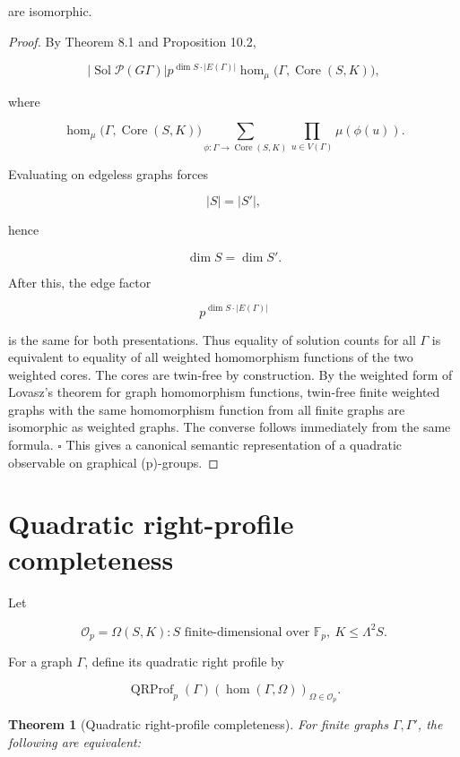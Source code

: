 \documentclass[11pt]{article}
\newtheorem{theorem}{Theorem}[section]
\begin{document}
are isomorphic.

\begin{proof}
By Theorem 8.1 and Proposition 10.2,

\[
|\operatorname{Sol}
{\mathcal P}(G
\Gamma)|
p^{\dim S\cdot |E(\Gamma)|}
\operatorname{hom}_{\mu}
\bigl(\Gamma,\operatorname{Core}(S,K)\bigr),
\]

where

\[
\operatorname{hom}_{\mu}
\bigl(\Gamma,\operatorname{Core}(S,K)\bigr)
\sum_{\phi:\Gamma\to\operatorname{Core}(S,K)}
\prod_{u\in V(\Gamma)}\mu(\phi(u)).
\]

Evaluating on edgeless graphs forces

\[
|S|=|S'|,
\]

hence

\[
\dim S=\dim S'.
\]

After this, the edge factor

\[
p^{\dim S\cdot |E(\Gamma)|}
\]

is the same for both presentations. Thus equality of solution counts for all $\Gamma$ is equivalent to equality of all weighted homomorphism functions of the two weighted cores. The cores are twin-free by construction. By the weighted form of Lovasz's theorem for graph homomorphism functions, twin-free finite weighted graphs with the same homomorphism function from all finite graphs are isomorphic as weighted graphs. The converse follows immediately from the same formula. $\square$ This gives a canonical semantic representation of a quadratic observable on graphical (p)-groups.

\end{proof}

\section{Quadratic right-profile completeness}

Let

\[
\mathcal O_p=
{\Omega(S,K):S\text{ finite-dimensional over }\mathbb F_p,\ K\le\Lambda^2S}.
\]

For a graph $\Gamma$, define its quadratic right profile by

\[
\operatorname{QRProf}_p(\Gamma)
\left(
\operatorname{hom}(\Gamma,\Omega)
\right)_{\Omega\in\mathcal O_p}.
\]

\begin{theorem}[Quadratic right-profile completeness]
For finite graphs $\Gamma,\Gamma'$, the following are equivalent:

\end{theorem}
\end{document}
